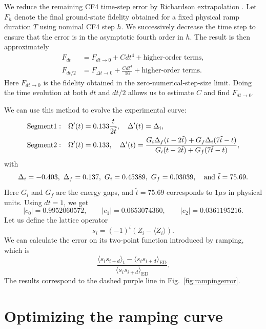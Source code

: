 \documentclass[a4paper,11pt]{article}
\theoremstyle{remark}
\theoremstyle{theorem}
\begin{document}
We reduce the remaining CF4 time-step error by Richardson extrapolation \cite{Richardson1911}.  Let $F_h$ denote the final ground-state fidelity obtained for a fixed physical ramp duration $T$ using nominal CF4 step $h$.  
We successively decrease the time step to ensure that the error is in the asymptotic fourth order in $h$. The result is then approximately
\begin{align*}
F_{dt}&=F_{d t\to0}+C dt^4+\text{higher-order terms},\\
F_{dt/2}&=F_{\Delta t\to0}+\frac{C dt^4}{16}
+\text{higher-order terms}.
\end{align*}
Here $F_{d t\to0}$ is the fidelity obtained in the zero-numerical-step-size limit.  Doing the time evolution at both $dt$ and $dt/2$ allows us to estimate $ C$ and find $F_{d t\to0}$.

We can use this method to evolve the experimental curve:
\begin{align}
{\rm Segment 1}: \quad& \Omega'(t)=0.133 \frac{t}{2\tilde{t}}, \quad \Delta'(t)=\Delta_i, \nonumber\\
{\rm Segment 2}: \quad& \Omega'(t)=0.133, \quad \Delta'(t)=\frac{G_i \Delta_f (t-2\tilde{t}) + G_f \Delta_i (7\tilde{t} - t)}{ G_i (t-2\tilde{t}) + G_f (7 \tilde{t}-t)},
\end{align}
with 
\begin{equation}
\Delta_i = -0.403,~\Delta_f = 0.137,~G_i =0.45389,~G_f = 0.03039, \quad {\rm and}~ \tilde{t}=75.69.
\end{equation}
Here $G_i$ and $G_f$ are the energy gaps, and $\tilde{t}=75.69$ corresponds to $1 \mu s$ in physical units. Using $dt=1$, we get 
\[
|c_0|=0.9952060572,\qquad
|c_1|=0.0653074360,\qquad
|c_2|=0.0361195216.
\]
Let us define the lattice operator 
$$
 s_i = (-1)^i (Z_i -\langle Z_i \rangle).
$$
We can calculate the error on its two-point function introduced by ramping, which is 
\begin{equation}\label{def:error}
\frac{
\langle s_i s_{i+d}\rangle_t-
\langle s_i s_{i+d}\rangle_{\mathrm{ED}}
}{
\langle s_i s_{i+d}\rangle_{\mathrm{ED}}
}.
\end{equation}
The results correspond to the dashed purple line in Fig.~\ref{fig:rampingerror}.


\section{Optimizing the ramping curve}
\end{document}
